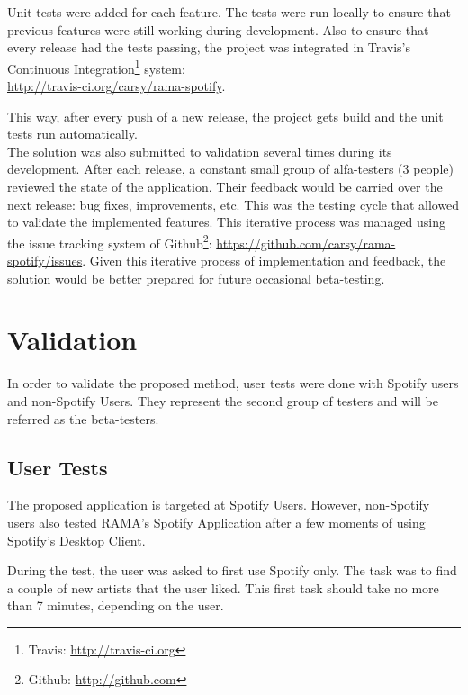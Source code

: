     Unit tests were added for each feature.
    The tests were run locally to ensure that previous features were still working during development.
    Also to ensure that every release had the tests passing, the project was integrated in Travis's Continuous Integration\footnote{Travis: \url{http://travis-ci.org}} system: \\
    \indent \url{http://travis-ci.org/carsy/rama-spotify}.

    This way, after every push of a new release, the project gets build and the unit tests run automatically. \\

    The solution was also submitted to validation several times during its development.
    After each release, a constant small group of alfa-testers (3 people) reviewed the state of the application.
    Their feedback would be carried over the next release: bug fixes, improvements, etc.
    This was the testing cycle that allowed to validate the implemented features.
    This iterative process was managed using the issue tracking system of Github\footnote{Github: \url{http://github.com}}: \url{https://github.com/carsy/rama-spotify/issues}.
    Given this iterative process of implementation and feedback, the solution would be better prepared for future occasional beta-testing.



  \clearpage

\section{Validation} %
\label{sec:validation}

  In order to validate the proposed method, user tests were done with Spotify users and non-Spotify Users.
  They represent the second group of testers and will be referred as the beta-testers.

  \subsection{User Tests} %
  \label{sub:user_tests}

    The proposed application is targeted at Spotify Users.
    However, non-Spotify users also tested RAMA's Spotify Application after a few moments of using Spotify's Desktop Client.

    During the test, the user was asked to first use Spotify only.
    The task was to find a couple of new artists that the user liked.
    This first task should take no more than 7 minutes, depending on the user.


